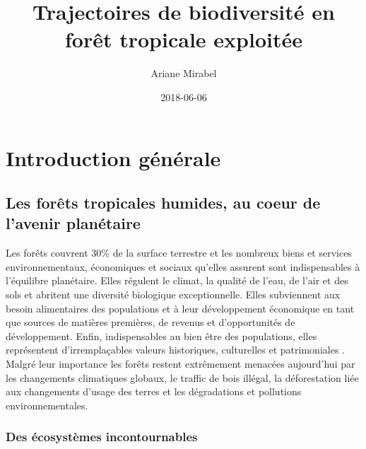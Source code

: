 \documentclass[
  11pt,
  french,
  A4paper,
  extrafontsizes,onecolumn,openright
  ]{memoir}
\title{Trajectoires de biodiversité en forêt tropicale exploitée}
\author{Ariane Mirabel}
\date{2018-06-06}
\begin{document}
\frontmatter



\makeflyleaf









\LargeMargins
{
\hypersetup{linkcolor=}
\setcounter{tocdepth}{3}
\tableofcontents
}



\LargeMargins
\mainmatter

\chapter{Introduction générale}\label{introduction-generale}

\section{Les forêts tropicales humides, au coeur de l'avenir
planétaire}\label{les-forets-tropicales-humides-au-coeur-de-lavenir-planetaire}

Les forêts couvrent 30\% de la surface terrestre et les nombreux biens
et services environnementaux, économiques et sociaux qu'elles assurent
sont indispensables à l'équilibre planétaire. Elles régulent le climat,
la qualité de l'eau, de l'air et des sols et abritent une diversité
biologique exceptionnelle. Elles subviennent aux besoin alimentaires des
populations et à leur développement économique en tant que sources de
matières premières, de revenus et d'opportunités de développement.
Enfin, indispensables au bien être des populations, elles représentent
d'irremplaçables valeurs historiques, culturelles et patrimoniales
\autocites{FRA2015}{Tilman2014}. Malgré leur importance les forêts
restent extrêmement menacées aujourd'hui par les changements climatiques
globaux, le traffic de bois illégal, la déforestation liée aux
changements d'usage des terres et les dégradations et pollutions
environnementales.

\subsection{Des écosystèmes
incontournables}\label{des-ecosystemes-incontournables}
\end{document}
